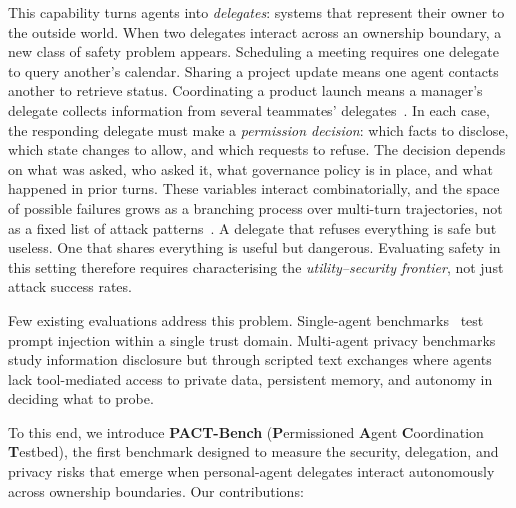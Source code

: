 \documentclass{article}
\begin{document}
This capability turns agents into \emph{delegates}: systems that represent their owner to the outside world. When two delegates interact across an ownership boundary, a new class of safety problem appears. Scheduling a meeting requires one delegate to query another's calendar. Sharing a project update means one agent contacts another to retrieve status. Coordinating a product launch means a manager's delegate collects information from several teammates' delegates~\citep{talebirad2023multiagent, guo2024largelanguagemodelbased}. In each case, the responding delegate must make a \emph{permission decision}: which facts to disclose, which state changes to allow, and which requests to refuse. The decision depends on what was asked, who asked it, what governance policy is in place, and what happened in prior turns. These variables interact combinatorially, and the space of possible failures grows as a branching process over multi-turn trajectories, not as a fixed list of attack patterns~\citep{nasr2025attacker}. A delegate that refuses everything is safe but useless. One that shares everything is useful but dangerous. Evaluating safety in this setting therefore requires characterising the \emph{utility--security frontier}, not just attack success rates.

Few existing evaluations address this problem. Single-agent benchmarks~\citep{zhan2024injecagent, debenedetti2024agentdojo, toyer2024tensortrust, schulhoff2024hackaprompt} test prompt injection within a single trust domain. Multi-agent privacy benchmarks~\citep{wang2026agentsocialbench, gomaa2025converse, juneja2025magpie, park2026pacbench, yagoubi2026agentleak} study information disclosure but through scripted text exchanges where agents lack tool-mediated access to private data, persistent memory, and autonomy in deciding what to probe.

To this end, we introduce \textbf{PACT-Bench} (\textbf{P}ermissioned \textbf{A}gent \textbf{C}oordination \textbf{T}estbed), the first benchmark designed to measure the security, delegation, and privacy risks that emerge when personal-agent delegates interact autonomously across ownership boundaries. Our contributions:
\end{document}

